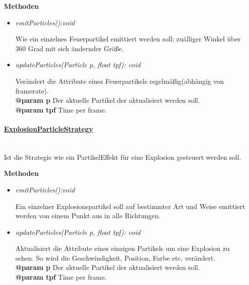                     \textbf{Methoden}
                    \begin{itemize}
                        \item \textit{emitParticles():void}
                            \begin{leftbar}[0.9\linewidth]
                            Wie ein einzelnes Feuerpartikel emittiert werden soll; zuälliger Winkel über
                            360 Grad mit sich ändernder Größe.   
                            \end{leftbar}
                        \item \textit{updateParticles(Particle p, float tpf): void}
                            \begin{leftbar}[0.9\linewidth]
                            Verändert die Attribute eines Feuerpartikels regelmäßig(abhängig von framerate).\\
                            \textbf{@param p} Der aktuelle Partikel der aktualisiert werden soll.\\
                            \textbf{@param tpf} Time per frame.\\
                            \end{leftbar}
                    \end{itemize}

                \pagebreak
                \paragraph{\underline{ExplosionParticleStrategy}}\mbox{}\\
                    Ist die Strategie wie ein PartikelEffekt für eine Explosion gesteuert
                    werden soll. \par

                    \textbf{Methoden}
                    \begin{itemize}
                        \item \textit{emitParticles():void}
                            \begin{leftbar}[0.9\linewidth]
                            Ein einzelner Explosionspartikel soll auf bestimmter Art und Weise emittiert werden
                            von einem Punkt aus in alle Richtungen.\\   
                            \end{leftbar}
                        \item \textit{updateParticles(Particle p, float tpf): void}
                            \begin{leftbar}[0.9\linewidth]
                            Aktualisiert die Attribute eines einzigen Partikels um eine Explosion zu sehen.
                            So wird die Geschwindigkeit, Position, Farbe etc. verändert.\\    
                            \textbf{@param p} Der aktuelle Partikel der aktualisiert werden soll.\\
                            \textbf{@param tpf} Time per frame.\\
                            \end{leftbar}
                    \end{itemize}
        \pagebreak